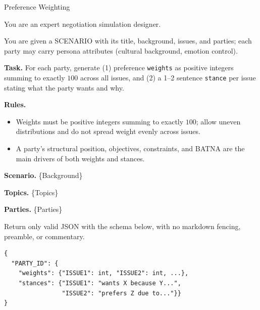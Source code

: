 \documentclass{llmxive}
\begin{document}
\begin{table}[p]
\centering
\begin{promptbox}{Preference Weighting}
\begin{systembox}
\scriptsize
You are an expert negotiation simulation designer.

\smallskip
You are given a SCENARIO with its title, background, issues, and parties; each party may carry persona attributes (cultural background, emotion control).

\smallskip
\textbf{Task.} For each party, generate (1) preference \texttt{weights} as positive integers summing to exactly $100$ across all issues, and (2) a 1--2 sentence \texttt{stance} per issue stating what the party wants and why.

\smallskip
\textbf{Rules.}
\begin{itemize}[leftmargin=*, noitemsep, topsep=2pt]
\item Weights must be positive integers summing to exactly $100$; allow uneven distributions and do not spread weight evenly across issues.
\item A party's structural position, objectives, constraints, and BATNA are the main drivers of both weights and stances.
\end{itemize}
\end{systembox}

\begin{userbox}
\scriptsize
\textbf{Scenario.} \{Background\}

\smallskip
\textbf{Topics.} \{Topics\}

\smallskip
\textbf{Parties.} \{Parties\}

\smallskip
Return only valid JSON with the schema below, with no markdown fencing, preamble, or commentary.
\begin{verbatim}
{
  "PARTY_ID": {
    "weights": {"ISSUE1": int, "ISSUE2": int, ...},
    "stances": {"ISSUE1": "wants X because Y...",
                "ISSUE2": "prefers Z due to..."}}
}
\end{verbatim}
\end{userbox}
\end{promptbox}
\vspace{-0.25cm}
\vspace{-0.3cm}
\label{tab:prompt-weight}
\caption{Prompt for per-party preference weighting.}
\end{table}
\end{document}
